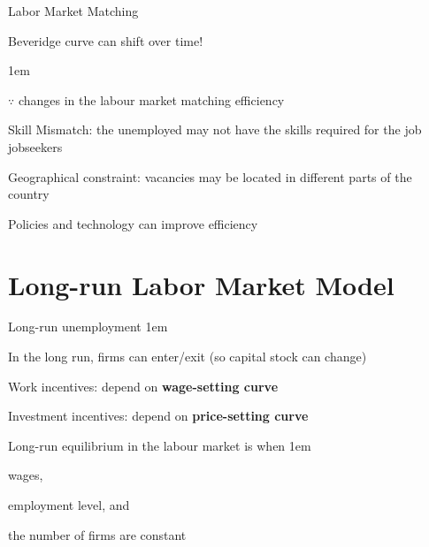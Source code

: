 \documentclass[11pt,aspectratio=43,usenames,dvipsnames]{beamer}
\let\olditemize=\itemize
\let\endolditemize=\enditemize
\renewenvironment{itemize}{\olditemize \itemsep1em}{\endolditemize}
\let\oldenumerate=\enumerate
\let\endoldenumerate=\endenumerate
\renewenvironment{enumerate}{\oldenumerate \itemsep1em}{ \endoldenumerate}
\theoremstyle{definition}
\begin{document}
\begin{frame}{Labor Market Matching}
\label{slide:Labor_Market_Matching}
    \begin{center}
        Beveridge curve can shift over time!
    \end{center}
    \begin{itemize}
        \item $ \because $ changes in the labour market matching efficiency
        \item \alert{Skill Mismatch}: the unemployed may not have the \alert{skills required} for the job jobseekers
        \item \alert{Geographical constraint}: vacancies may be located in different parts of the country
        \item Policies and technology can improve efficiency
    \end{itemize}

\end{frame}

\section[\faWrench]{Long-run Labor Market Model}
\label{sec:Long_run_Labor_Market_Model}

\begin{frame}{Long-run unemployment}
\label{slide:Long_run_unemployment}
\begin{itemize}
    \item In the long run, firms can enter/exit (so capital stock can change)
    \item \alert{Work incentives}: depend on \textbf{wage-setting curve}
    \item \alert{Investment incentives}: depend on \textbf{price-setting curve}
    \item \alert{Long-run equilibrium} in the labour market is when
    \begin{enumerate}
        \item wages,
        \item employment level, and
        \item the number of firms are constant
    \end{enumerate}


\end{itemize}

\end{frame}
\end{document}
